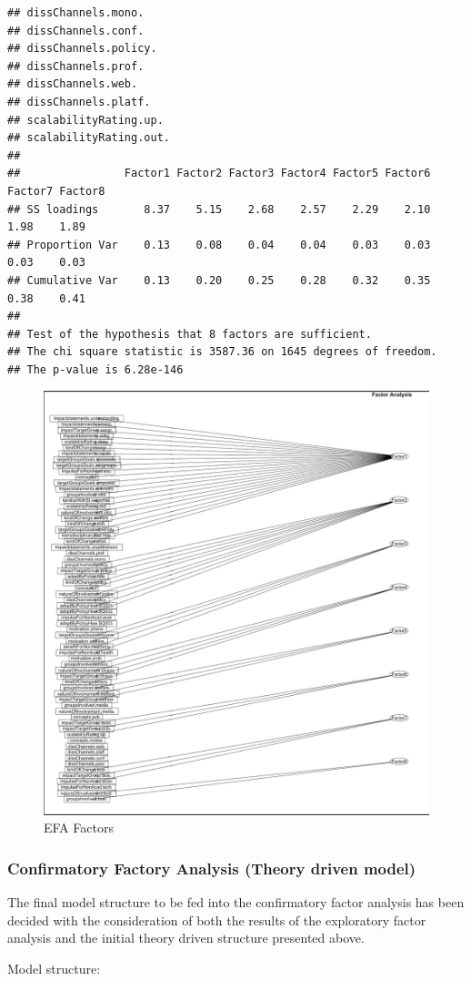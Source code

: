 \documentclass[
]{article}
\begin{document}
\begin{verbatim}
## dissChannels.mono.                             
## dissChannels.conf.                             
## dissChannels.policy.                           
## dissChannels.prof.                             
## dissChannels.web.                              
## dissChannels.platf.                            
## scalabilityRating.up.                          
## scalabilityRating.out.                         
## 
##                Factor1 Factor2 Factor3 Factor4 Factor5 Factor6 Factor7 Factor8
## SS loadings       8.37    5.15    2.68    2.57    2.29    2.10    1.98    1.89
## Proportion Var    0.13    0.08    0.04    0.04    0.03    0.03    0.03    0.03
## Cumulative Var    0.13    0.20    0.25    0.28    0.32    0.35    0.38    0.41
## 
## Test of the hypothesis that 8 factors are sufficient.
## The chi square statistic is 3587.36 on 1645 degrees of freedom.
## The p-value is 6.28e-146
\end{verbatim}

\begin{figure}

{\centering \includegraphics[width=0.3\linewidth]{../06_model/efa_result} 

}

\caption{EFA Factors}\label{fig:unnamed-chunk-8}
\end{figure}

\hypertarget{confirmatory-factory-analysis-theory-driven-model}{%
\subsubsection{Confirmatory Factory Analysis (Theory driven
model)}\label{confirmatory-factory-analysis-theory-driven-model}}

The final model structure to be fed into the confirmatory factor
analysis has been decided with the consideration of both the results of
the exploratory factor analysis and the initial theory driven structure
presented above.

Model structure:
\end{document}

